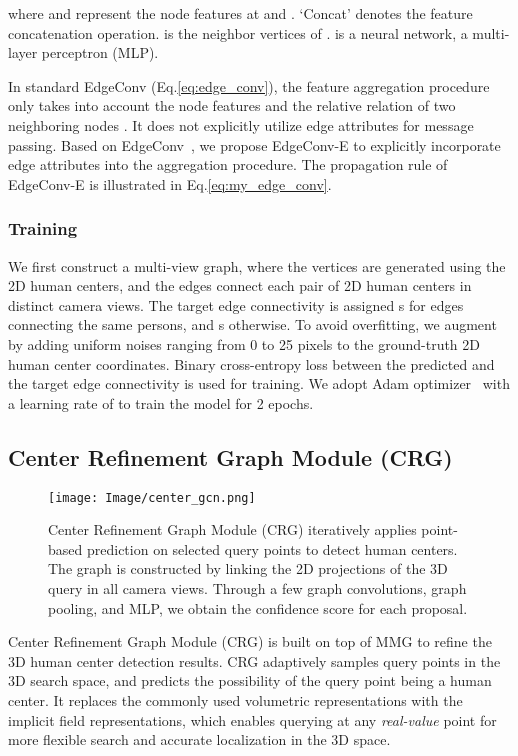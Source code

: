 \documentclass[10pt,twocolumn,letterpaper]{article}
\begin{document}
where  and  represent the node features at  and . `Concat' denotes the feature concatenation operation.  is the neighbor vertices of .  is a neural network, \ie a multi-layer perceptron (MLP). 

In standard EdgeConv (Eq.\ref{eq:edge_conv}), the feature aggregation procedure only takes into account the node features  and the relative relation of two neighboring nodes . It does not explicitly utilize edge attributes for message passing.
Based on EdgeConv~\cite{wang2019dynamic}, we propose EdgeConv-E to explicitly incorporate edge attributes  into the aggregation procedure. The propagation rule of EdgeConv-E is illustrated in Eq.\ref{eq:my_edge_conv}.




\subsubsection{Training} 

We first construct a multi-view graph, where the vertices are generated using the 2D human centers, and the edges connect each pair of 2D human centers in distinct camera views. The target edge connectivity is assigned s for edges connecting the same persons, and s otherwise. To avoid overfitting, we augment by adding uniform noises ranging from 0 to 25 pixels to the ground-truth 2D human center coordinates. Binary cross-entropy loss between the predicted and the target edge connectivity is used for training. We adopt Adam optimizer~\cite{kingma2014method} with a learning rate of  to train the model for 2 epochs.


\subsection{Center Refinement Graph Module (CRG)}
\label{sec:CRG}

\begin{figure}[t]
	\centering
	\texttt{[image: Image/center\_gcn.png]}
	\caption{Center Refinement Graph Module (CRG) iteratively applies point-based prediction on selected query points to detect human centers. The graph is constructed by linking the 2D projections of the 3D query in all camera views. Through a few graph convolutions, graph pooling, and MLP, we obtain the confidence score for each proposal.}
	\label{fig:center_graph}
\end{figure}

Center Refinement Graph Module (CRG) is built on top of MMG to refine the 3D human center detection results. CRG adaptively samples query points in the 3D search space, and predicts the possibility of the query point being a human center. It replaces the commonly used volumetric representations with the implicit field representations, which enables querying at any \emph{real-value} point for more flexible search and accurate localization in the 3D space. 
\end{document}

